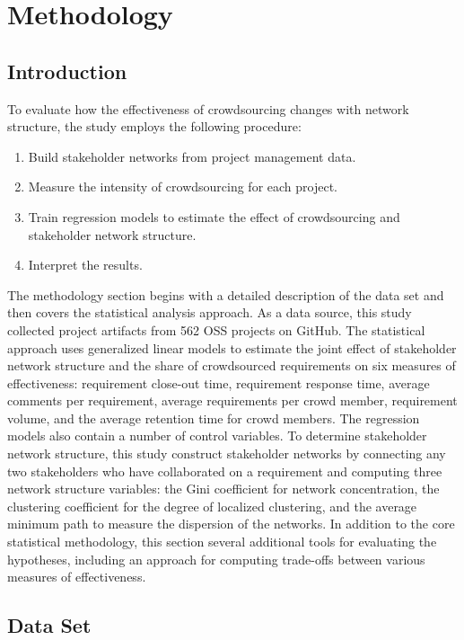 \doublespacing
\chapter{Methodology} \label{chap:methodology}

\section{Introduction}

To evaluate how the effectiveness of crowdsourcing changes with network structure, the study employs the following procedure:

\begin{enumerate}
    \item Build stakeholder networks from project management data.
    \item Measure the intensity of crowdsourcing for each project.
    \item Train regression models to estimate the effect of crowdsourcing and stakeholder network structure.
    \item Interpret the results.
\end{enumerate}

The methodology section begins with a detailed description of the data set and then covers the statistical analysis approach. As a data source, this study collected project artifacts from 562 OSS projects on GitHub. The statistical approach uses generalized linear models to estimate the joint effect of stakeholder network structure and the share of crowdsourced requirements on six measures of effectiveness: requirement close-out time, requirement response time, average comments per requirement, average requirements per crowd member, requirement volume, and the average retention time for crowd members. The regression models also contain a number of control variables. To determine stakeholder network structure, this study construct stakeholder networks by connecting any two stakeholders who have collaborated on a requirement and computing three network structure variables: the Gini coefficient for network concentration, the clustering coefficient for the degree of localized clustering, and the average minimum path to measure the dispersion of the networks. In addition to the core statistical methodology, this section several additional tools for evaluating the hypotheses, including an approach for computing trade-offs between various measures of effectiveness.

\section{Data Set}
\label{data_set_section}

